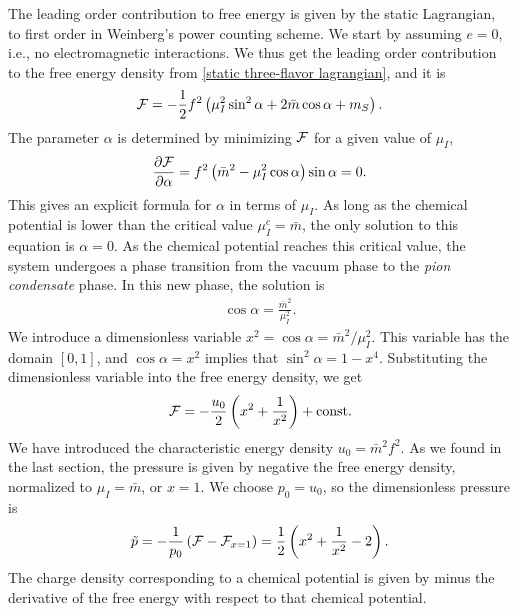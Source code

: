 The leading order contribution to free energy is given by the static Lagrangian, to first order in Weinberg's power counting scheme.
We start by assuming $e = 0$, i.e., no electromagnetic interactions.
We thus get the leading order contribution to the free energy density from \autoref{static three-flavor lagrangian}, and it is
%
\begin{equation}
    \mathcal{F} 
    = 
    - \frac{1}{2} f^2
    \left(
        \mu_I^2 \sin^2\alpha
        + 2\bar m \cos\alpha
        + m_S
    \right).
\end{equation}
%
The parameter $\alpha$ is determined by minimizing $\mathcal{F}$ for a given value of $\mu_I$,
%
\begin{equation}
    \pdv{\mathcal{F}}{\alpha} = f^2 \left(\bar m^2 - \mu_I^2 \cos \alpha\right) \sin\alpha = 0.
\end{equation}
%
This gives an explicit formula for $\alpha$ in terms of $\mu_I$.
As long as the chemical potential is lower than the critical value $\mu_I^c = \bar m$, the only solution to this equation is $\alpha = 0$.
As the chemical potential reaches this critical value, the system undergoes a phase transition from the vacuum phase to the \emph{pion condensate} phase.
In this new phase, the solution is
%
\begin{align}
    \label{alpha as function of mu lowest order}
    \cos \alpha = \frac{\bar m^2}{\mu_I^2}.
\end{align}
%
We introduce a dimensionless variable $x^2 = \cos\alpha = \bar m^2 / \mu_I^2$.
This variable has the domain $[0, 1]$, and $\cos \alpha = x^2$ implies that $\sin^2 \alpha = 1 - x^4$.
Substituting the dimensionless variable into the free energy density, we get 
%
\begin{equation}
    \mathcal{F} = - \frac{u_0}{2} \left( x^2 + \frac{1}{x^2} \right) +\mathrm{const.}
\end{equation}
%
We have introduced the characteristic energy density $u_0 = \bar m^2 f^2$.
As we found in the last section, the pressure is given by negative the free energy density, normalized to $\mu_I = \bar m$, or $x = 1$.
We choose $p_0 = u_0$, so the dimensionless pressure is
%
\begin{equation}
    \label{pressure leading order chpt}
    \tilde p = -\frac{1}{p_0} \left(\mathcal{F} - \mathcal{F}_{x=1}\right) 
    = \frac{1}{2} \left( x^2 + \frac{1}{x^2} - 2 \right).
\end{equation}
%
The charge density corresponding to a chemical potential is given by minus the derivative of the free energy with respect to that chemical potential. 
